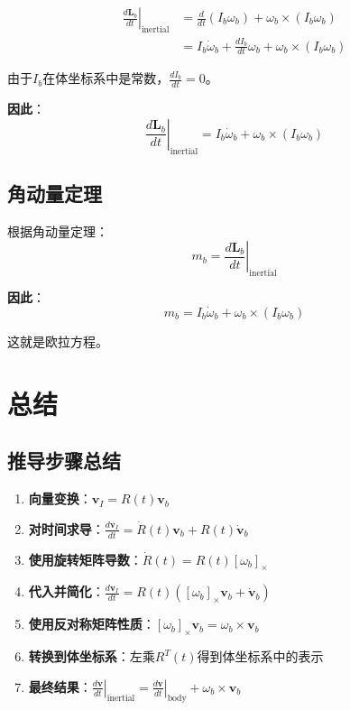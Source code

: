 \documentclass[12pt,a4paper]{article}
\begin{document}
\begin{align}
\left.\frac{d\bm{L}_b}{dt}\right|_{\text{inertial}} &= \frac{d}{dt}(I_b \omega_b) + \omega_b \times (I_b \omega_b) \\
&= I_b \dot{\omega}_b + \frac{dI_b}{dt} \omega_b + \omega_b \times (I_b \omega_b)
\end{align}

由于$I_b$在体坐标系中是常数，$\frac{dI_b}{dt} = 0$。

\textbf{因此}：
\begin{equation}
\left.\frac{d\bm{L}_b}{dt}\right|_{\text{inertial}} = I_b \dot{\omega}_b + \omega_b \times (I_b \omega_b)
\end{equation}

\subsection{角动量定理}

根据角动量定理：
\begin{equation}
m_b = \left.\frac{d\bm{L}_b}{dt}\right|_{\text{inertial}}
\end{equation}

\textbf{因此}：
\begin{equation}
m_b = I_b \dot{\omega}_b + \omega_b \times (I_b \omega_b)
\end{equation}

这就是欧拉方程。

\section{总结}

\subsection{推导步骤总结}

\begin{enumerate}
\item \textbf{向量变换}：$\bm{v}_I = R(t) \bm{v}_b$

\item \textbf{对时间求导}：$\frac{d\bm{v}_I}{dt} = \dot{R}(t) \bm{v}_b + R(t) \dot{\bm{v}}_b$

\item \textbf{使用旋转矩阵导数}：$\dot{R}(t) = R(t) [\omega_b]_{\times}$

\item \textbf{代入并简化}：$\frac{d\bm{v}_I}{dt} = R(t) ([\omega_b]_{\times} \bm{v}_b + \dot{\bm{v}}_b)$

\item \textbf{使用反对称矩阵性质}：$[\omega_b]_{\times} \bm{v}_b = \omega_b \times \bm{v}_b$

\item \textbf{转换到体坐标系}：左乘$R^T(t)$得到体坐标系中的表示

\item \textbf{最终结果}：$\left.\frac{d\bm{v}}{dt}\right|_{\text{inertial}} = \left.\frac{d\bm{v}}{dt}\right|_{\text{body}} + \omega_b \times \bm{v}_b$
\end{enumerate}
\end{document}
